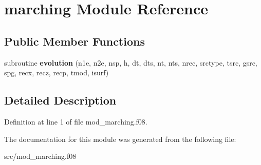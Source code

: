 \hypertarget{classmarching}{\section{marching Module Reference}
\label{classmarching}
}
\subsection*{Public Member Functions}
\begin{DoxyCompactItemize}
\item 
\hypertarget{classmarching_a645dee4b9ec52a99feb262036258ea6a}{subroutine {\bfseries evolution} (n1e, n2e, nsp, h, dt, dts, nt, nts, nrec, srctype, tsrc, gsrc, spg, recx, recz, recp, tmod, isurf)}\label{classmarching_a645dee4b9ec52a99feb262036258ea6a}

\end{DoxyCompactItemize}


\subsection{Detailed Description}


Definition at line 1 of file mod\-\_\-marching.\-f08.



The documentation for this module was generated from the following file\-:\begin{DoxyCompactItemize}
\item 
src/mod\-\_\-marching.\-f08\end{DoxyCompactItemize}

